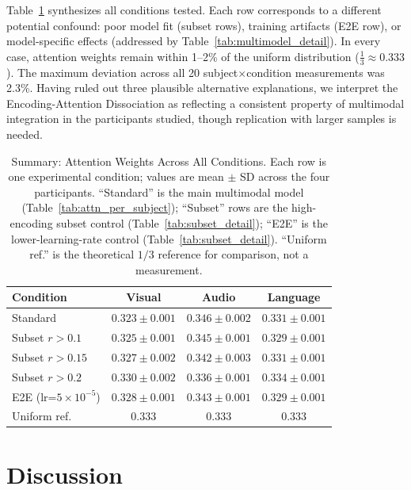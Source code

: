 \documentclass[conference]{IEEEtran}
\begin{document}
Table~\ref{tab:controls_summary} synthesizes all conditions tested. Each row corresponds to a different potential confound: poor model fit (subset rows), training artifacts (E2E row), or model-specific effects (addressed by Table~\ref{tab:multimodel_detail}). In every case, attention weights remain within 1--2\% of the uniform distribution ($\frac{1}{3} \approx 0.333$). The maximum deviation across all 20 subject$\times$condition measurements was 2.3\%. Having ruled out three plausible alternative explanations, we interpret the Encoding-Attention Dissociation as reflecting a consistent property of multimodal integration in the participants studied, though replication with larger samples is needed.

\begin{table}[t]
\caption{Summary: Attention Weights Across All Conditions. Each row is one experimental condition; values are mean $\pm$ SD across the four participants. ``Standard'' is the main multimodal model (Table~\ref{tab:attn_per_subject}); ``Subset'' rows are the high-encoding subset control (Table~\ref{tab:subset_detail}); ``E2E'' is the lower-learning-rate control (Table~\ref{tab:subset_detail}). ``Uniform ref.'' is the theoretical $1/3$ reference for comparison, not a measurement.}
\label{tab:controls_summary}
\centering
\begin{tabular*}{\columnwidth}{@{\extracolsep{\fill}}lccc@{}}
\toprule
Condition & Visual & Audio & Language \\
\midrule
Standard & $0.323 \pm 0.001$ & $0.346 \pm 0.002$ & $0.331 \pm 0.001$ \\
Subset $r\!>\!0.1$ & $0.325 \pm 0.001$ & $0.345 \pm 0.001$ & $0.329 \pm 0.001$ \\
Subset $r\!>\!0.15$ & $0.327 \pm 0.002$ & $0.342 \pm 0.003$ & $0.331 \pm 0.001$ \\
Subset $r\!>\!0.2$ & $0.330 \pm 0.002$ & $0.336 \pm 0.001$ & $0.334 \pm 0.001$ \\
E2E (lr=$5\!\times\!10^{-5}$) & $0.328 \pm 0.001$ & $0.343 \pm 0.001$ & $0.329 \pm 0.001$ \\
\midrule
Uniform ref. & 0.333 & 0.333 & 0.333 \\
\bottomrule
\end{tabular*}
\end{table}

\section{Discussion}
\end{document}
